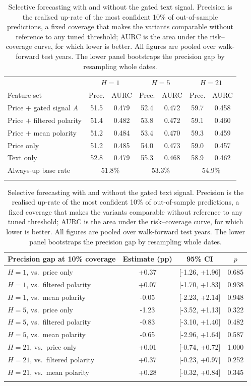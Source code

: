 \begin{table}[htbp]
\caption{Selective forecasting with and without the gated text signal. Precision
is the realised up-rate of the most confident 10\% of out-of-sample predictions,
a fixed coverage that makes the variants comparable without reference to any
tuned threshold; AURC is the area under the risk--coverage curve, for which lower
is better. All figures are pooled over walk-forward test years. The lower panel
bootstraps the precision gap by resampling whole dates.}
\label{tab:gate}
\small
\begin{tabular}{@{}lcccccc@{}}
\toprule
 & \multicolumn{2}{c}{$H=1$} & \multicolumn{2}{c}{$H=5$} & \multicolumn{2}{c}{$H=21$} \\
Feature set & Prec. & AURC & Prec. & AURC & Prec. & AURC \\
\midrule
Price $+$ gated signal $A$ & 51.5 & 0.479 & 52.4 & 0.472 & 59.7 & 0.458 \\
Price $+$ filtered polarity & 51.4 & 0.482 & 53.8 & 0.472 & 59.1 & 0.460 \\
Price $+$ mean polarity & 51.2 & 0.484 & 53.4 & 0.470 & 59.3 & 0.459 \\
Price only & 51.2 & 0.485 & 54.0 & 0.473 & 59.0 & 0.457 \\
Text only & 52.8 & 0.479 & 55.3 & 0.468 & 58.9 & 0.462 \\
\midrule
Always-up base rate & \multicolumn{2}{c}{51.8\%} & \multicolumn{2}{c}{53.3\%} & \multicolumn{2}{c}{54.9\%} \\
\botrule
\end{tabular}

\vspace{0.6em}
\begin{tabular}{@{}lccc@{}}
\toprule
Precision gap at 10\% coverage & Estimate (pp) & 95\% CI & $p$ \\
\midrule
$H=1$, vs.\ price only & +0.37 & [-1.26, +1.96] & 0.685 \\
$H=1$, vs.\ filtered polarity & +0.07 & [-1.70, +1.83] & 0.938 \\
$H=1$, vs.\ mean polarity & -0.05 & [-2.23, +2.14] & 0.948 \\
$H=5$, vs.\ price only & -1.23 & [-3.52, +1.13] & 0.322 \\
$H=5$, vs.\ filtered polarity & -0.83 & [-3.10, +1.40] & 0.482 \\
$H=5$, vs.\ mean polarity & -0.65 & [-2.96, +1.64] & 0.587 \\
$H=21$, vs.\ price only & +0.01 & [-0.74, +0.72] & 1.000 \\
$H=21$, vs.\ filtered polarity & +0.37 & [-0.23, +0.97] & 0.252 \\
$H=21$, vs.\ mean polarity & +0.28 & [-0.32, +0.84] & 0.345 \\
\botrule
\end{tabular}
\end{table}
